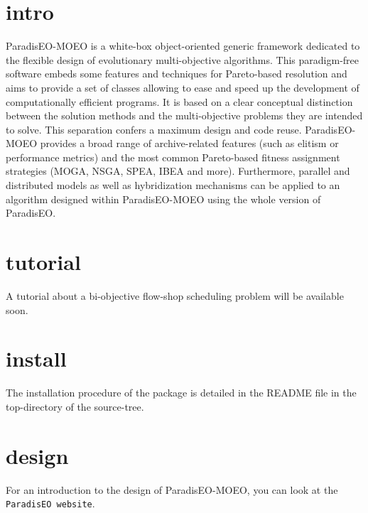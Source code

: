 \section{intro}\label{main_intro}
Paradis\-EO-MOEO is a white-box object-oriented generic framework dedicated to the flexible design of evolutionary multi-objective algorithms. This paradigm-free software embeds some features and techniques for Pareto-based resolution and aims to provide a set of classes allowing to ease and speed up the development of computationally efficient programs. It is based on a clear conceptual distinction between the solution methods and the multi-objective problems they are intended to solve. This separation confers a maximum design and code reuse. Paradis\-EO-MOEO provides a broad range of archive-related features (such as elitism or performance metrics) and the most common Pareto-based fitness assignment strategies (MOGA, NSGA, SPEA, IBEA and more). Furthermore, parallel and distributed models as well as hybridization mechanisms can be applied to an algorithm designed within Paradis\-EO-MOEO using the whole version of Paradis\-EO.\section{tutorial}\label{main_tutorial}
A tutorial about a bi-objective flow-shop scheduling problem will be available soon.\section{install}\label{main_install}
The installation procedure of the package is detailed in the README file in the top-directory of the source-tree.\section{design}\label{main_design}
For an introduction to the design of Paradis\-EO-MOEO, you can look at the {\tt Paradis\-EO website}. 